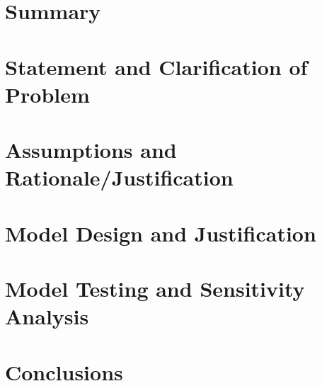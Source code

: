 \documentclass[12pt]{article}
\begin{document}
\section*{Summary}
\thispagestyle{empty}

 \clearpage
\setcounter{page}{1}
\section{Statement and Clarification of Problem}%

\clearpage
\section{Assumptions and Rationale/Justification}%

\clearpage
\section{Model Design and Justification} %

\section{Model Testing and Sensitivity Analysis} %

\section{Conclusions} %
\end{document}
